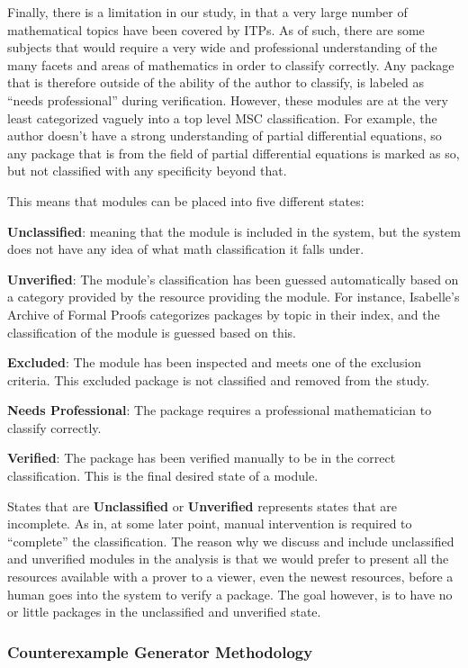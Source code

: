 \documentclass[
]{article}
\begin{document}
Finally, there is a limitation in our study, in that a very large number
of mathematical topics have been covered by ITPs. As of such, there are
some subjects that would require a very wide and professional
understanding of the many facets and areas of mathematics in order to
classify correctly. Any package that is therefore outside of the ability
of the author to classify, is labeled as ``needs professional'' during
verification. However, these modules are at the very least categorized
vaguely into a top level MSC classification. For example, the author
doesn't have a strong understanding of partial differential equations,
so any package that is from the field of partial differential equations
is marked as so, but not classified with any specificity beyond that.

This means that modules can be placed into five different states:

\textbf{Unclassified}: meaning that the module is included in the
system, but the system does not have any idea of what math
classification it falls under.

\textbf{Unverified}: The module's classification has been guessed
automatically based on a category provided by the resource providing the
module. For instance, Isabelle's Archive of Formal Proofs categorizes
packages by topic in their index, and the classification of the module
is guessed based on this.

\textbf{Excluded}: The module has been inspected and meets one of the
exclusion criteria. This excluded package is not classified and removed
from the study.

\textbf{Needs Professional}: The package requires a professional
mathematician to classify correctly.

\textbf{Verified}: The package has been verified manually to be in the
correct classification. This is the final desired state of a module.

States that are \textbf{Unclassified} or \textbf{Unverified} represents
states that are incomplete. As in, at some later point, manual
intervention is required to ``complete'' the classification. The reason
why we discuss and include unclassified and unverified modules in the
analysis is that we would prefer to present all the resources available
with a prover to a viewer, even the newest resources, before a human
goes into the system to verify a package. The goal however, is to have
no or little packages in the unclassified and unverified state.

\hypertarget{sec:counterexample_meth}{%
\subsubsection{Counterexample Generator
Methodology}\label{sec:counterexample_meth}}
\end{document}
